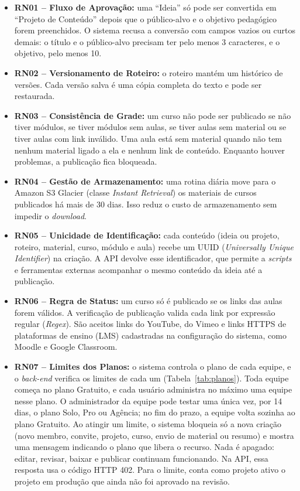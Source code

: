 \begin{itemize}
    \item \textbf{RN01 -- Fluxo de Aprovação:} uma ``Ideia'' só pode ser convertida em ``Projeto de Conteúdo'' depois que o público-alvo e o objetivo pedagógico forem preenchidos. O sistema recusa a conversão com campos vazios ou curtos demais: o título e o público-alvo precisam ter pelo menos 3 caracteres, e o objetivo, pelo menos 10.

    \item \textbf{RN02 -- Versionamento de Roteiro:} o roteiro mantém um histórico de versões. Cada versão salva é uma cópia completa do texto e pode ser restaurada.

    \item \textbf{RN03 -- Consistência de Grade:} um curso não pode ser publicado se não tiver módulos, se tiver módulos sem aulas, se tiver aulas sem material ou se tiver aulas com link inválido. Uma aula está sem material quando não tem nenhum material ligado a ela e nenhum link de conteúdo. Enquanto houver problemas, a publicação fica bloqueada.

    \item \textbf{RN04 -- Gestão de Armazenamento:} uma rotina diária move para o Amazon S3 Glacier (classe \textit{Instant Retrieval}) os materiais de cursos publicados há mais de 30 dias. Isso reduz o custo de armazenamento sem impedir o \textit{download}.

    \item \textbf{RN05 -- Unicidade de Identificação:} cada conteúdo (ideia ou projeto, roteiro, material, curso, módulo e aula) recebe um UUID (\textit{Universally Unique Identifier}) na criação. A API devolve esse identificador, que permite a \textit{scripts} e ferramentas externas acompanhar o mesmo conteúdo da ideia até a publicação.

    \item \textbf{RN06 -- Regra de Status:} um curso só é publicado se os links das aulas forem válidos. A verificação de publicação valida cada link por expressão regular (\textit{Regex}). São aceitos links do YouTube, do Vimeo e links HTTPS de plataformas de ensino (LMS) cadastradas na configuração do sistema, como Moodle e Google Classroom.

    \item \textbf{RN07 -- Limites dos Planos:} o sistema controla o plano de cada equipe, e o \textit{back-end} verifica os limites de cada um (Tabela~\ref{tab:planos}). Toda equipe começa no plano Gratuito, e cada usuário administra no máximo uma equipe nesse plano. O administrador da equipe pode testar uma única vez, por 14 dias, o plano Solo, Pro ou Agência; no fim do prazo, a equipe volta sozinha ao plano Gratuito. Ao atingir um limite, o sistema bloqueia só a nova criação (novo membro, convite, projeto, curso, envio de material ou resumo) e mostra uma mensagem indicando o plano que libera o recurso. Nada é apagado: editar, revisar, baixar e publicar continuam funcionando. Na API, essa resposta usa o código HTTP 402. Para o limite, conta como projeto ativo o projeto em produção que ainda não foi aprovado na revisão.
\end{itemize}

